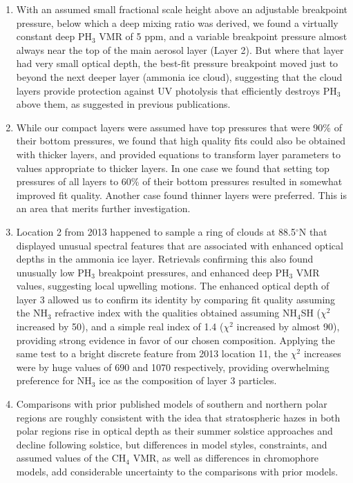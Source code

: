 \documentclass[article,11pt]{emulateapj}
\def\degx{$^\circ$}
\def\chf{CH$_4$ }
\def\chisq{$\chi^2$ }
\def\pht{PH$_3$ }
\def\nht{NH$_3$ }
\def\nhfsh{NH$_4$SH }
\begin{document}
\begin{enumerate}
\item With an assumed small fractional scale height above an
  adjustable breakpoint pressure, below which a deep mixing ratio was
  derived, we found a virtually constant deep \pht VMR of 5 ppm, and a
  variable breakpoint pressure almost always near the top of the main
  aerosol layer (Layer 2).  But where that layer had very small
  optical depth, the best-fit pressure breakpoint moved just to beyond the next
  deeper layer (ammonia ice cloud), suggesting that the cloud layers
  provide protection against UV photolysis that efficiently destroys
  \pht above them, as suggested in previous publications.

\item While our compact layers were assumed have top pressures that
  were 90\% of their bottom pressures, we found that high quality fits
  could also be obtained with thicker layers, and provided equations
  to transform layer parameters to values appropriate to thicker
  layers.  In one case we found that setting top pressures of all
  layers to 60\% of their bottom pressures resulted in somewhat improved
  fit quality. Another case found thinner layers were preferred.
  This is an area that merits further investigation.

\item Location 2 from 2013 happened to sample a
ring of clouds at 88.5\degx N that displayed unusual spectral features that
are associated with enhanced optical depths in the ammonia ice layer.  Retrievals
confirming this also found  unusually low  \pht breakpoint 
pressures, and enhanced deep \pht VMR values, suggesting local upwelling motions.
The enhanced optical depth of layer 3 allowed us to confirm its identity by 
comparing fit quality assuming the \nht refractive index with 
the qualities obtained assuming \nhfsh (\chisq increased by 50),
 and a simple real index of 1.4 (\chisq increased by almost 90), providing
strong evidence in favor of our chosen composition. Applying
the same test to a bright discrete feature from 2013 location 11, the \chisq
increases were by huge values of 690 and 1070 respectively, providing overwhelming
preference for \nht ice as the composition of layer 3 particles. 

\item Comparisons with prior published models of southern and northern polar regions
are roughly consistent with the idea that stratospheric hazes in both polar
regions rise in optical depth as their summer solstice approaches and decline
following solstice, but differences in model styles, constraints, and assumed
values of the \chf VMR, as well as differences in chromophore models, add
considerable uncertainty to the comparisons with prior models.

\end{enumerate}
\end{document}
